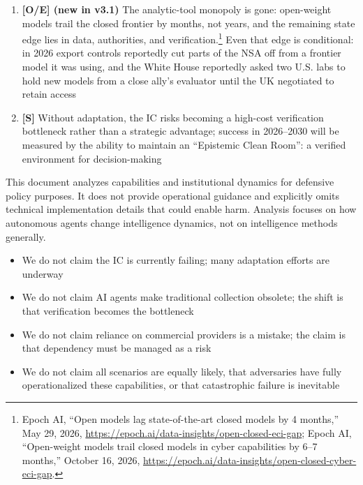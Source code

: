 \documentclass[11pt,letterpaper]{article}
\begin{document}
\begin{keybox}
\begin{enumerate}
  \item \textbf{[O/E] (new in v3.1)} The analytic-tool monopoly is gone: open-weight models trail the closed frontier by months, not years, and the remaining state edge lies in data, authorities, and verification.\footnote{Epoch AI, ``Open models lag state-of-the-art closed models by 4 months,'' May 29, 2026, \url{https://epoch.ai/data-insights/open-closed-eci-gap}; Epoch AI, ``Open-weight models trail closed models in cyber capabilities by 6--7 months,'' October 16, 2026, \url{https://epoch.ai/data-insights/open-closed-cyber-eci-gap}.} Even that edge is conditional: in 2026 export controls reportedly cut parts of the NSA off from a frontier model it was using, and the White House reportedly asked two U.S. labs to hold new models from a close ally's evaluator until the UK negotiated to retain access
  \item \textbf{[S]} Without adaptation, the IC risks becoming a high-cost verification bottleneck rather than a strategic advantage; success in 2026--2030 will be measured by the ability to maintain an ``Epistemic Clean Room'': a verified environment for decision-making
\end{enumerate}
\end{keybox}

\begin{warnbox}
This document analyzes capabilities and institutional dynamics for defensive policy purposes. It does not provide operational guidance and explicitly omits technical implementation details that could enable harm. Analysis focuses on how autonomous agents change intelligence dynamics, not on intelligence methods generally.
\end{warnbox}

\begin{infobox}
\begin{itemize}[nosep]
  \item We do not claim the IC is currently failing; many adaptation efforts are underway
  \item We do not claim AI agents make traditional collection obsolete; the shift is that verification becomes the bottleneck
  \item We do not claim reliance on commercial providers is a mistake; the claim is that dependency must be managed as a risk
  \item We do not claim all scenarios are equally likely, that adversaries have fully operationalized these capabilities, or that catastrophic failure is inevitable
\end{itemize}
\end{infobox}
\end{document}
